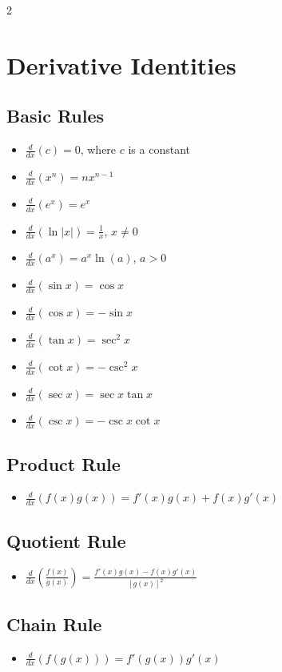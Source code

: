 \begin{multicols}{2}

\section*{Derivative Identities} 

\subsection*{Basic Rules}
\begin{itemize}
\item $\frac{d}{dx}(c) = 0$, where $c$ is a constant
\item $\frac{d}{dx}(x^n) = nx^{n-1}$
\item $\frac{d}{dx}(e^x) = e^x$
\item $\frac{d}{dx}(\ln|x|) = \frac{1}{x}$, $x \neq 0$
\item $\frac{d}{dx}(a^x) = a^x \ln(a)$, $a > 0$
\item $\frac{d}{dx}(\sin x) = \cos x$
\item $\frac{d}{dx}(\cos x) = -\sin x$
\item $\frac{d}{dx}(\tan x) = \sec^2 x$
\item $\frac{d}{dx}(\cot x) = -\csc^2 x$
\item $\frac{d}{dx}(\sec x) = \sec x \tan x$
\item $\frac{d}{dx}(\csc x) = -\csc x \cot x$
\end{itemize}

\subsection*{Product Rule}
\begin{itemize}
\item $\frac{d}{dx}(f(x)g(x)) = f'(x)g(x) + f(x)g'(x)$
\end{itemize}

\subsection*{Quotient Rule}
\begin{itemize}
\item $\frac{d}{dx}\left(\frac{f(x)}{g(x)}\right) = \frac{f'(x)g(x) - f(x)g'(x)}{[g(x)]^2}$
\end{itemize}

\subsection*{Chain Rule}
\begin{itemize}
\item $\frac{d}{dx}(f(g(x))) = f'(g(x))g'(x)$
\end{itemize}


\end{multicols}

